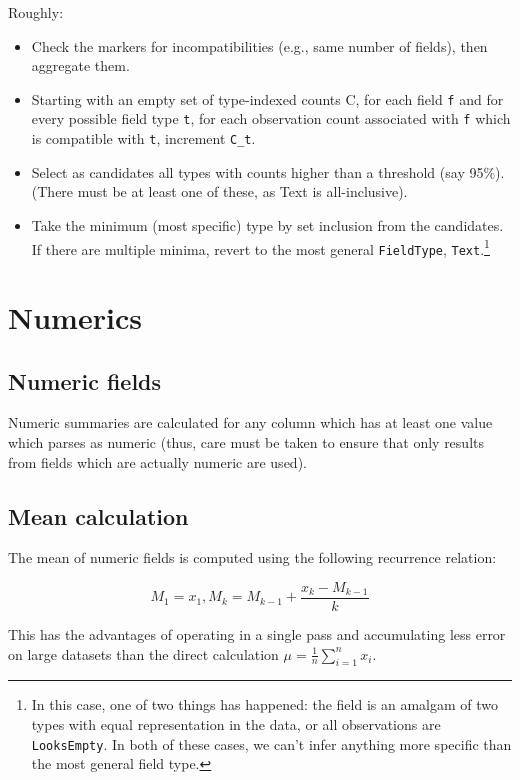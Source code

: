 \documentclass[a4paper]{article}
\begin{document}
Roughly:

\begin{itemize}
\item
  Check the markers for incompatibilities (e.g., same number of fields),
  then aggregate them.
\item
  Starting with an empty set of type-indexed counts C, for each field
  \texttt{f} and for every possible field type \texttt{t}, for each
  observation count associated with \texttt{f} which is compatible with
  \texttt{t}, increment \texttt{C\_t}.
\item
  Select as candidates all types with counts higher than a threshold
  (say 95\%). (There must be at least one of these, as Text is
  all-inclusive).
\item
  Take the minimum (most specific) type by set inclusion from the
  candidates. If there are multiple minima, revert to the most general
  \texttt{FieldType}, \texttt{Text}.\footnote{In this case, one of two
    things has happened: the field is an amalgam of two types with
    equal representation in the data, or all observations are
    \texttt{LooksEmpty}. In both of these cases, we can't infer
    anything more specific than the most general field type.}
\end{itemize}

\section{Numerics}\label{numerics}

\subsection{Numeric fields}\label{numeric-fields}

Numeric summaries are calculated for any column which has at least one
value which parses as numeric (thus, care must be taken to ensure that
only results from fields which are actually numeric are used).

\subsection{Mean calculation}\label{mean-calculation}

The mean of numeric fields is computed using the following recurrence
relation\cite[pp.~232]{Knuth1997}:

\[M_1 = x_1, M_k = M_{k-1} + \frac{x_k - M_{k-1}}{k}\]

This has the advantages of operating in a single pass and accumulating
less error on large datasets than the direct calculation
\(\mu = \frac{1}{n} \sum\limits_{i=1}^n x_i\).
\end{document}
